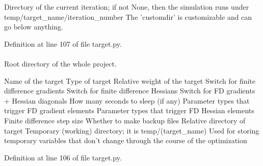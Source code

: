 \-Directory of the current iteration; if not \-None, then the simulation runs under temp/target\-\_\-name/iteration\-\_\-number \-The 'customdir' is customizable and can go below anything.

\-Definition at line 107 of file target.\-py.

\hypertarget{classforcebalance_1_1target_1_1Target_aede2856573b890cd47054ad36937d6f6}{
\paragraph[{tempdir}]{}}\label{classforcebalance_1_1target_1_1Target_aede2856573b890cd47054ad36937d6f6}


\-Root directory of the whole project. 

\-Name of the target \-Type of target \-Relative weight of the target \-Switch for finite difference gradients \-Switch for finite difference \-Hessians \-Switch for \-F\-D gradients + \-Hessian diagonals \-How many seconds to sleep (if any) \-Parameter types that trigger \-F\-D gradient elements \-Parameter types that trigger \-F\-D \-Hessian elements \-Finite difference step size \-Whether to make backup files \-Relative directory of target \-Temporary (working) directory; it is temp/(target\-\_\-name) \-Used for storing temporary variables that don't change through the course of the optimization 

\-Definition at line 106 of file target.\-py.

\hypertarget{classforcebalance_1_1BaseClass_afd68efa29ccd2f320f4cf82198214aac}{
\paragraph[{verbose\-\_\-options}]{}}\label{classforcebalance_1_1BaseClass_afd68efa29ccd2f320f4cf82198214aac}



